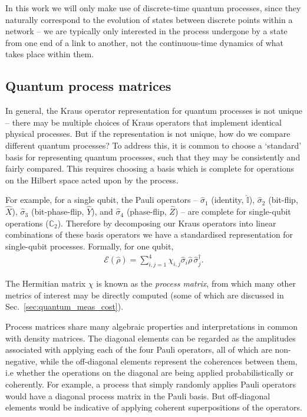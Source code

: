 In this work we will only make use of discrete-time quantum processes, since they naturally correspond to the evolution of states between discrete points within a network -- we are typically only interested in the process undergone by a state from one end of a link to another, not the continuous-time dynamics of what takes place within them.

%
%

\subsection{Quantum process matrices} 

In general, the Kraus operator representation for quantum processes is not unique -- there may be multiple choices of Kraus operators that implement identical physical processes. But if the representation is not unique, how do we compare different quantum processes? To address this, it is common to choose a `standard' basis for representing quantum processes, such that they may be consistently and fairly compared. This requires choosing a basis which is complete for operations on the Hilbert space acted upon by the process.

For example, for a single qubit, the Pauli operators -- $\hat\sigma_1$ (identity, $\mathbb{\hat{I}}$), $\hat\sigma_2$ (bit-flip, $\hat{X}$), $\hat\sigma_3$ (bit-phase-flip, $\hat{Y}$), and $\hat\sigma_4$ (phase-flip, $\hat{Z}$) -- are complete for single-qubit operations ($\mathbb{C}_2$). Therefore by decomposing our Kraus operators into linear combinations of these basis operators we have a standardised representation for single-qubit processes. Formally, for one qubit,
\begin{align} \label{eq:process_matrix}
\mathcal{E}(\hat\rho) = \sum_{i,j=1}^4 \chi_{i,j} \hat{\sigma}_i\hat\rho\,\hat{\sigma}_j^\dag.
\end{align}

The Hermitian matrix $\chi$ is known as the \textit{process matrix}, from which many other metrics of interest may be directly computed (some of which are discussed in Sec.~\ref{sec:quantum_meas_cost}).

Process matrices share many algebraic properties and interpretations in common with density matrices. The diagonal elements can be regarded as the amplitudes associated with applying each of the four Pauli operators, all of which are non-negative, while the off-diagonal elements represent the coherences between them, i.e whether the operations on the diagonal are being applied probabilistically or coherently. For example, a process that simply randomly applies Pauli operators would have a diagonal process matrix in the Pauli basis. But off-diagonal elements would be indicative of applying coherent superpositions of the operators.

